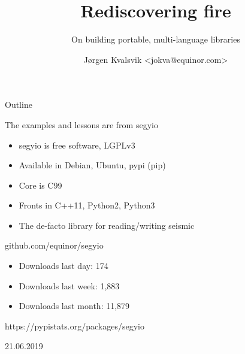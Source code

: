 \documentclass[pdf]{beamer}
\title{Rediscovering fire}
\subtitle{On building portable, multi-language libraries}
\author{Jørgen Kvalsvik <jokva@equinor.com>}
\begin{document}
\maketitle

\begin{frame}{Outline}
    \tableofcontents

\end{frame}

\begin{frame}
    \begin{block}{}
        The examples and lessons are from segyio
    \end{block}

    \begin{block}{}
        \begin{itemize}
            \item segyio is free software, LGPLv3
            \item Available in Debian, Ubuntu, pypi (pip)
            \item Core is C99
            \item Fronts in C++11, Python2, Python3
            \item The de-facto library for reading/writing seismic
        \end{itemize}
    \end{block}

    \begin{block}{}
        github.com/equinor/segyio
    \end{block}
\end{frame}

\begin{frame}
    \begin{block}{}
        \begin{itemize}
            \item Downloads last day: 174
            \item Downloads last week: 1,883
            \item Downloads last month: 11,879
        \end{itemize}
    \end{block}

    https://pypistats.org/packages/segyio

    21.06.2019
\end{frame}
\end{document}
